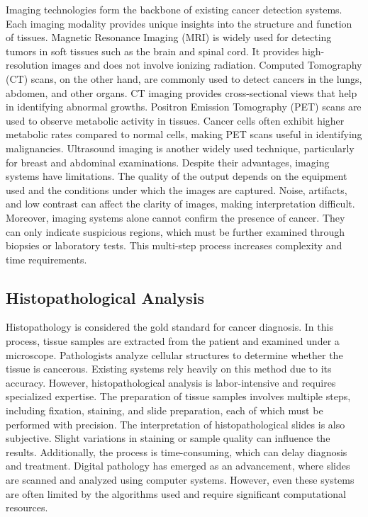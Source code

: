 \documentclass[a4paper,12pt]{report}
\begin{document}
\begin{doublespace}
Imaging technologies form the backbone of existing cancer detection systems. Each imaging modality provides unique insights into the structure and function of tissues.
Magnetic Resonance Imaging (MRI) is widely used for detecting tumors in soft tissues such as the brain and spinal cord. It provides high-resolution images and does not involve ionizing radiation. Computed Tomography (CT) scans, on the other hand, are commonly used to detect cancers in the lungs, abdomen, and other organs. CT imaging provides cross-sectional views that help in identifying abnormal growths.
Positron Emission Tomography (PET) scans are used to observe metabolic activity in tissues. Cancer cells often exhibit higher metabolic rates compared to normal cells, making PET scans useful in identifying malignancies. Ultrasound imaging is another widely used technique, particularly for breast and abdominal examinations.
Despite their advantages, imaging systems have limitations.
The quality of the output depends on the equipment used and the conditions under which the images are captured. Noise, artifacts, and low contrast can affect the clarity of images, making interpretation difficult.
Moreover, imaging systems alone cannot confirm the presence of cancer. They can only indicate suspicious regions, which must be further examined through biopsies or laboratory tests. This multi-step process increases complexity and time requirements.

\subsection{ Histopathological Analysis}
\label{sec:2.4}

Histopathology is considered the gold standard for cancer diagnosis. In this process, tissue samples are extracted from the patient and examined under a microscope. Pathologists analyze cellular structures to determine whether the tissue is cancerous.
Existing systems rely heavily on this method due to its accuracy. However, histopathological analysis is labor-intensive and requires specialized expertise. The preparation of tissue samples involves multiple steps, including fixation, staining, and slide preparation, each of which must be performed with precision.
The interpretation of histopathological slides is also subjective. Slight variations in staining or sample quality can influence the results. Additionally, the process is time-consuming, which can delay diagnosis and treatment.
Digital pathology has emerged as an advancement, where slides are scanned and analyzed using computer systems. However, even these systems are often limited by the algorithms used and require significant computational resources.



\end{doublespace}
\end{document}
